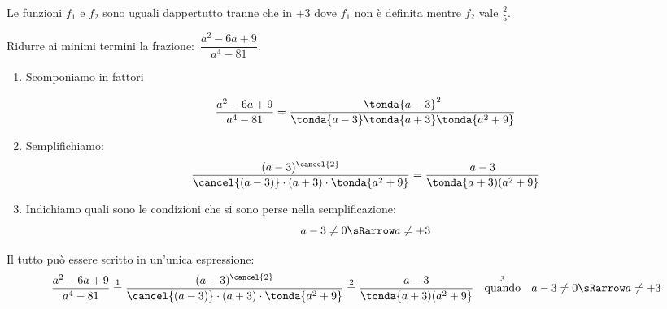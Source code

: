 {\centering\graficofrazioneb}
{\centering\graficofrazionec}

Le funzioni \(f_1\) e \(f_2\) sono uguali dappertutto tranne che in \(+3\) 
dove \(f_1\) non è definita mentre \(f_2\) vale \(\frac{2}{5}\).

 \begin{esempio}
Ridurre ai minimi termini la frazione:~\(\dfrac{a^{2}-6a+9}{a^{4}-81}\).
\begin{enumerate}
 \item Scomponiamo in fattori
 \[\dfrac{a^{2}-6a+9}{a^{4}-81} = 
   \dfrac{\tonda{a-3}^2}
         {\tonda{a-3} \tonda{a+3} \tonda{a^{2}+9}}\]
 \item Semplifichiamo:
 \[\dfrac{(a-3)^{\cancel{2}}}
         {\cancel{(a-3)}\cdot (a+3)\cdot  \tonda{a^{2}+9} }=
   \dfrac{a-3}{\tonda{a+3)(a^{2}+9}}\]
 \item Indichiamo quali sono le condizioni che si sono perse nella 
semplificazione:
 \[a-3 \neq 0 \sRarrow a \neq +3\]
\end{enumerate}
Il tutto può essere scritto in un'unica espressione:
 \[\dfrac{a^{2}-6a+9}{a^{4}-81} \stackrel{1}{=} 
   \dfrac{(a-3)^{\cancel{2}}}
         {\cancel{(a-3)}\cdot (a+3)\cdot \tonda{a^{2}+9}}\stackrel{2}{=} 
   \dfrac{a-3}{ \tonda{a+3)(a^{2}+9}} \stackrel{3}{\stext{quando}} 
   a-3 \neq 0 \sRarrow a \neq +3\]
 \end{esempio}

